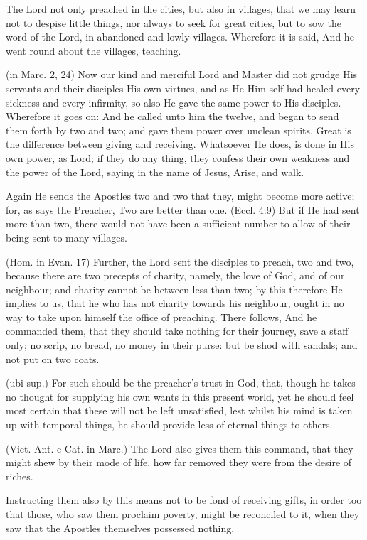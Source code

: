  The Lord not only preached in the cities, but also in villages, that we may learn not to despise little things, nor always to seek for great cities, but to sow the word of the Lord, in abandoned and lowly villages. Wherefore it is said, And he went round about the villages, teaching.

 (in Marc. 2, 24) Now our kind and merciful Lord and Master did not grudge His servants and their disciples His own virtues, and as He Him self had healed every sickness and every infirmity, so also He gave the same power to His disciples. Wherefore it goes on: And he called unto him the twelve, and began to send them forth by two and two; and gave them power over unclean spirits. Great is the difference between giving and receiving. Whatsoever He does, is done in His own power, as Lord; if they do any thing, they confess their own weakness and the power of the Lord, saying in the name of Jesus, Arise, and walk.

 Again He sends the Apostles two and two that they, might become more active; for, as says the Preacher, Two are better than one. (Eccl. 4:9) But if He had sent more than two, there would not have been a sufficient number to allow of their being sent to many villages.

 (Hom. in Evan. 17) Further, the Lord sent the disciples to preach, two and two, because there are two precepts of charity, namely, the love of God, and of our neighbour; and charity cannot be between less than two; by this therefore He implies to us, that he who has not charity towards his neighbour, ought in no way to take upon himself the office of preaching. There follows, And he commanded them, that they should take nothing for their journey, save a staff only; no scrip, no bread, no money in their purse: but be shod with sandals; and not put on two coats.

 (ubi sup.) For such should be the preacher’s trust in God, that, though he takes no thought for supplying his own wants in this present world, yet he should feel most certain that these will not be left unsatisfied, lest whilst his mind is taken up with temporal things, he should provide less of eternal things to others.

 (Vict. Ant. e Cat. in Marc.) The Lord also gives them this command, that they might shew by their mode of life, how far removed they were from the desire of riches.

 Instructing them also by this means not to be fond of receiving gifts, in order too that those, who saw them proclaim poverty, might be reconciled to it, when they saw that the Apostles themselves possessed nothing.

